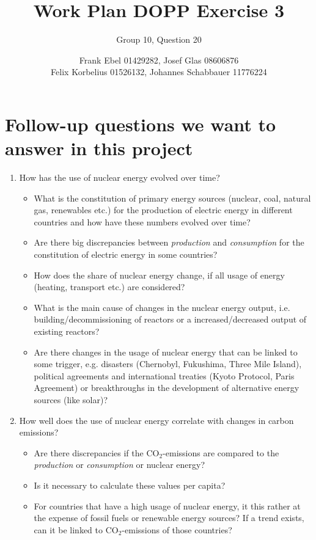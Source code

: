 \documentclass[a4paper,10pt]{scrartcl}
\author{Frank Ebel 01429282, Josef Glas 08606876\\Felix Korbelius 01526132, Johannes Schabbauer 11776224}
\title{\vspace*{-1cm}Work Plan DOPP Exercise 3}
\subtitle{Group 10, Question 20}
\date{}
\begin{document}
\maketitle
\vspace*{-1cm}


\section*{Follow-up questions we want to answer in this project}

\begin{enumerate}
\item{How has the use of nuclear energy evolved over time?}

	\begin{itemize}
	\item What is the constitution of primary energy sources (nuclear, coal, natural gas, renewables etc.) for the production of electric energy in different countries and how have these numbers evolved over time?
	\item Are there big discrepancies between \emph{production} and \emph{consumption} for the constitution of electric energy in some countries?
	\item How does the share of nuclear energy change, if all usage of energy (heating, transport etc.) are considered?
	\item What is the main cause of changes in the nuclear energy output, i.e. building/decommissioning of reactors or a increased/decreased output of existing reactors?
	\item Are there changes in the usage of nuclear energy that can be linked to some trigger, e.g. disasters (Chernobyl, Fukushima, Three Mile Island), political agreements and international treaties (Kyoto Protocol, Paris Agreement) or breakthroughs in the development of alternative energy sources (like solar)?
	\end{itemize}


\item{How well does the use of nuclear energy correlate with changes in carbon emissions?}
	
	\begin{itemize}
	\item Are there discrepancies if the CO$_2$-emissions are compared to the \emph{production} or \emph{consumption} or nuclear energy? 
	\item Is it necessary to calculate these values per capita?
	\item For countries that have a high usage of nuclear energy, it this rather at the expense of fossil fuels or renewable energy sources? If a trend exists, can it be linked to CO$_2$-emissions of those countries?
	\end{itemize}	
	

\end{enumerate}
\end{document}
